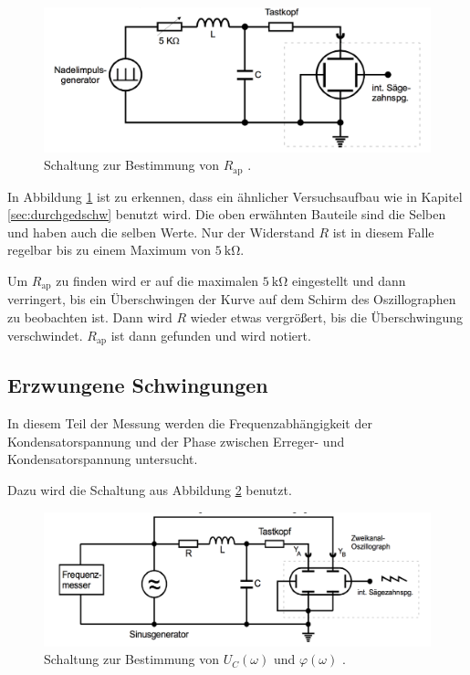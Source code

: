 \begin{figure}[h]
  \centering
  \includegraphics[width = \textwidth]{Schaltungb.pdf}
  \caption{Schaltung zur Bestimmung von $R_{\text{ap}}$ \cite{anleitung}.}
  \label{fig:schaltb}
\end{figure}

In Abbildung \ref{fig:schaltb} ist zu erkennen, dass ein ähnlicher
Versuchsaufbau wie in Kapitel \ref{sec:durchgedschw} benutzt wird.
Die oben erwähnten Bauteile sind die Selben und haben auch die selben Werte.
Nur der Widerstand $R$ ist in diesem Falle regelbar bis zu einem Maximum
von $\SI{5}{\kilo\ohm}$.

Um $R_{\text{ap}}$ zu finden wird er auf die maximalen $\SI{5}{\kilo\ohm}$
eingestellt und dann verringert, bis ein Überschwingen der Kurve auf dem
Schirm des Oszillographen zu beobachten ist. Dann wird $R$ wieder etwas
vergrößert, bis die Überschwingung verschwindet. $R_{\text{ap}}$ ist dann
gefunden und wird notiert.

\subsection{Erzwungene Schwingungen}

In diesem Teil der Messung werden die Frequenzabhängigkeit der Kondensatorspannung
und der Phase zwischen Erreger- und Kondensatorspannung untersucht.

Dazu wird die Schaltung aus Abbildung \ref{fig:schaltcd} benutzt.

\begin{figure}[h]
  \centering
  \includegraphics[width = \textwidth]{Schaltungcd.pdf}
  \caption{Schaltung zur Bestimmung von $U_C(\omega)$ und $\varphi(\omega)$ \cite{anleitung}.}
  \label{fig:schaltcd}
\end{figure}

